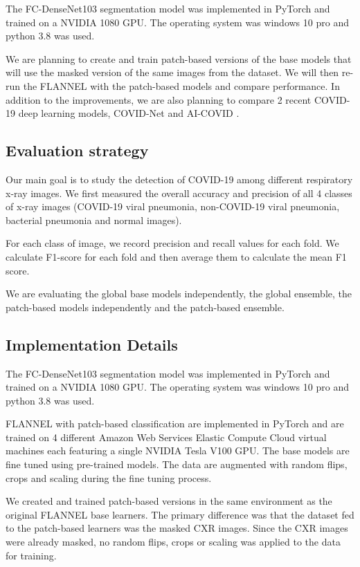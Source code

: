 \documentclass{sigkddExp}
\begin{document}
The FC-DenseNet103 segmentation model was implemented in PyTorch and trained on a NVIDIA 1080 GPU. The operating system was windows 10 pro and python 3.8 was used. 

We are planning to create and train patch-based versions of the base models
that will use the masked version of the same images from the dataset. We will
then re-run the FLANNEL with the patch-based models and compare performance.
In addition to the improvements, we are  also planning to compare 2 recent
COVID-19 deep learning models, COVID-Net \cite{wang2020covidnet} and AI-COVID
\cite{pmid32339081}.


\subsection{Evaluation strategy}
Our main goal is to study the detection of COVID-19 among different respiratory
x-ray images. We first measured the overall accuracy and precision of all 4
classes of x-ray images (COVID-19 viral pneumonia, non-COVID-19 viral pneumonia,
bacterial pneumonia and normal images).

For each class of image, we record precision and recall values for each fold.
We calculate F1-score for each fold and then average them to calculate the mean
F1 score.

We are evaluating the global base models independently, the global ensemble,
the patch-based models independently and the patch-based ensemble.

\subsection{Implementation Details}
The FC-DenseNet103 segmentation model was implemented in PyTorch and trained on a NVIDIA 1080 GPU. The operating system was windows 10 pro and python 3.8 was used. 

FLANNEL with patch-based classification are implemented in PyTorch and are
trained on 4 different Amazon Web Services Elastic Compute Cloud virtual
machines each featuring a single NVIDIA Tesla V100 GPU. The base models
are fine tuned using pre-trained models. The data are
augmented with random flips, crops and scaling during the fine tuning process.


We created and trained patch-based versions in the same environment as the original FLANNEL base learners. The primary difference was that the dataset fed to the patch-based learners was the masked CXR images. Since the CXR images were already masked, no random flips, crops or scaling was applied to the data for training.
\end{document}
